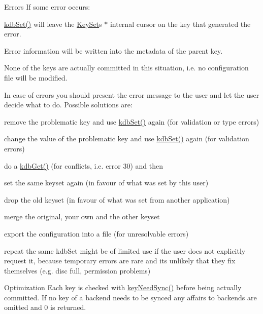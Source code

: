 \begin{DoxyParagraph}{Errors}
If some error occurs\+:
\begin{DoxyItemize}
\item \hyperlink{group__kdb_ga11436b058408f83d303ca5e996832bcf}{kdb\+Set()} will leave the \hyperlink{classkdb_1_1KeySet}{Key\+Set}\textquotesingle{}s $\ast$ internal cursor on the key that generated the error.
\item Error information will be written into the metadata of the parent key.
\item None of the keys are actually committed in this situation, i.\+e. no configuration file will be modified.
\end{DoxyItemize}
\end{DoxyParagraph}
In case of errors you should present the error message to the user and let the user decide what to do. Possible solutions are\+:
\begin{DoxyItemize}
\item remove the problematic key and use \hyperlink{group__kdb_ga11436b058408f83d303ca5e996832bcf}{kdb\+Set()} again (for validation or type errors)
\item change the value of the problematic key and use \hyperlink{group__kdb_ga11436b058408f83d303ca5e996832bcf}{kdb\+Set()} again (for validation errors)
\item do a \hyperlink{group__kdb_ga28e385fd9cb7ccfe0b2f1ed2f62453a1}{kdb\+Get()} (for conflicts, i.\+e. error 30) and then
\begin{DoxyItemize}
\item set the same keyset again (in favour of what was set by this user)
\item drop the old keyset (in favour of what was set from another application)
\item merge the original, your own and the other keyset
\end{DoxyItemize}
\item export the configuration into a file (for unresolvable errors)
\item repeat the same kdb\+Set might be of limited use if the user does not explicitly request it, because temporary errors are rare and its unlikely that they fix themselves (e.\+g. disc full, permission problems)
\end{DoxyItemize}

\begin{DoxyParagraph}{Optimization}
Each key is checked with \hyperlink{group__keytest_gaf247df0de7aca04b32ef80e39ef12950}{key\+Need\+Sync()} before being actually committed. If no key of a backend needs to be synced any affairs to backends are omitted and 0 is returned.
\end{DoxyParagraph}

